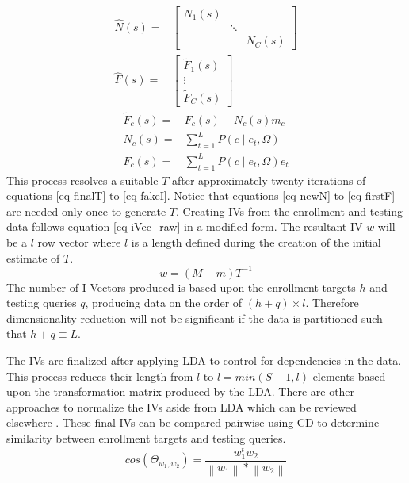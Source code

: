 \begin{align}
\hat{N}(s)=& \begin{bmatrix} N_{1}(s) &  &  \\  & \ddots &  \\  &  & N_{C}(s) \end{bmatrix} \label{eq-newN} \\
\hat{F}(s)=& \begin{bmatrix} \widetilde{F}_{1}(s) \\ \vdots \\ \widetilde{F}_{C}(s) \end{bmatrix}  \label{eq-matStats}
\end{align}
\begin{align}
\widetilde{F}_{c}(s) =& F_{c}(s) - N_{c}(s)m_{c} \\ \label{eq:modF}
N_{c}(s) =& \sum_{t=1}^{L} P( c \mid e_{t} , \Omega ) \\
F_{c}(s) =& \sum_{t=1}^{L} P( c \mid e_{t} , \Omega ) e_{t} \label{eq-firstF}
\end{align}
This process resolves a suitable $T$ after approximately twenty iterations of equations \ref{eq-finalT} to \ref{eq-fakeI}. Notice that equations \ref{eq-newN} to \ref{eq-firstF} are needed only once to generate $T$. Creating \acp{IV} from the enrollment and testing data follows equation \ref{eq-iVec_raw} in a modified form. The resultant \ac{IV} $w$ will be a $l$ row vector where $l$ is a length defined during the creation of the initial estimate of $T$.
\begin{equation}
w = (M-m)T^{-1}
\end{equation}
The number of I-Vectors produced is based upon the enrollment targets $h$ and testing queries $q$, producing data on the order of $(h+q)\times l$. Therefore dimensionality reduction will not be significant if the data is partitioned such that $h+q \equiv L$.
\par
The \acp{IV} are finalized after applying \ac{LDA} to control for dependencies in the data. This process reduces their length from $l$ to $ l = min(S-1,l)$ elements based upon the transformation matrix produced by the \ac{LDA}. There are other approaches to normalize the \acp{IV} aside from \ac{LDA} which can be reviewed elsewhere \cite{Dehak2011}. These final \acp{IV} can be compared pairwise using \ac{CD} to determine similarity between enrollment targets and testing queries.
\begin{equation}
cos(\Theta_{w_{1},w_{2}})=\frac{w_{1}^{t}w_{2}}{\left\lVert w_{1} \right\rVert * \left\lVert w_{2} \right\rVert}
\end{equation}

